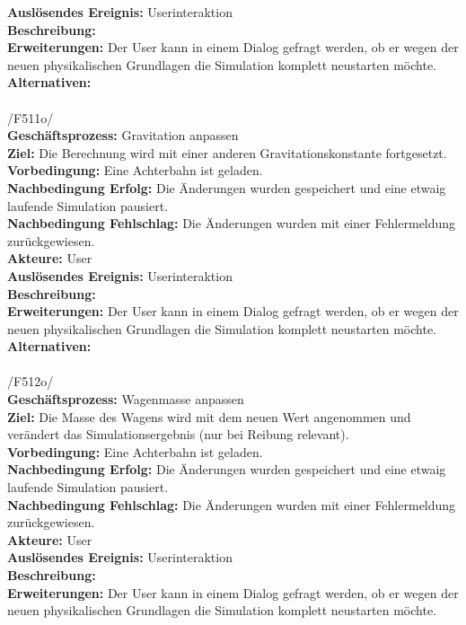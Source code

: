 \textbf{Auslösendes Ereignis:} Userinteraktion\\
\textbf{Beschreibung:} \\
\textbf{Erweiterungen:} Der User kann in einem Dialog gefragt werden, ob er wegen der neuen physikalischen Grundlagen die Simulation komplett neustarten möchte.\\
\textbf{Alternativen:}\\
\\
/F511o/\\
\textbf{Geschäftsprozess:} Gravitation anpassen\\
\textbf{Ziel:} Die Berechnung wird mit einer anderen Gravitationskonstante fortgesetzt.\\
\textbf{Vorbedingung:} Eine Achterbahn ist geladen.\\
\textbf{Nachbedingung Erfolg:} Die Änderungen wurden gespeichert und eine etwaig laufende Simulation pausiert.\\
\textbf{Nachbedingung Fehlschlag:} Die Änderungen wurden mit einer Fehlermeldung zurückgewiesen.\\
\textbf{Akteure:} User\\
\textbf{Auslösendes Ereignis:} Userinteraktion\\
\textbf{Beschreibung:} \\
\textbf{Erweiterungen:} Der User kann in einem Dialog gefragt werden, ob er wegen der neuen physikalischen Grundlagen die Simulation komplett neustarten möchte.\\
\textbf{Alternativen:}\\
\\
/F512o/\\
\textbf{Geschäftsprozess:} Wagenmasse anpassen\\
\textbf{Ziel:} Die Masse des Wagens wird mit dem neuen Wert angenommen und verändert das Simulationsergebnis (nur bei Reibung relevant).\\
\textbf{Vorbedingung:} Eine Achterbahn ist geladen.\\
\textbf{Nachbedingung Erfolg:} Die Änderungen wurden gespeichert und eine etwaig laufende Simulation pausiert.\\
\textbf{Nachbedingung Fehlschlag:} Die Änderungen wurden mit einer Fehlermeldung zurückgewiesen.\\
\textbf{Akteure:} User\\
\textbf{Auslösendes Ereignis:} Userinteraktion\\
\textbf{Beschreibung:} \\
\textbf{Erweiterungen:} Der User kann in einem Dialog gefragt werden, ob er wegen der neuen physikalischen Grundlagen die Simulation komplett neustarten möchte.\\
